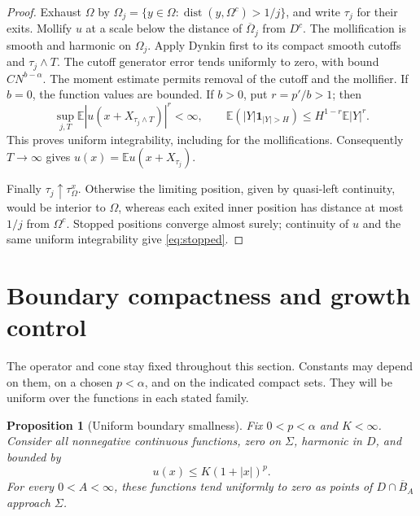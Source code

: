\documentclass[11pt]{article}
\newtheorem{proposition}[theorem]{Proposition}
\numberwithin{equation}{section}
\newcommand{\E}{\mathbb E}
\newcommand{\dist}{\operatorname{dist}}
\begin{document}
\begin{proof}
Exhaust \(\Omega\) by
\(\Omega_j=\{y\in\Omega:\dist(y,\Omega^c)>1/j\}\), and write
\(\tau_j\) for their exits. Mollify \(u\) at a scale below the distance
of \(\overline\Omega_j\) from \(D^c\). The mollification is smooth and
harmonic on \(\Omega_j\). Apply Dynkin first to its compact smooth cutoffs
and \(\tau_j\wedge T\). The cutoff generator error tends uniformly to
zero, with bound \(C N^{b-\alpha}\).
The moment estimate permits removal of the cutoff and the mollifier.
If \(b=0\), the function values are bounded. If \(b>0\), put
\(r=p'/b>1\); then
\[
 \sup_{j,T}\E|u(x+X_{\tau_j\wedge T})|^r<\infty,
 \qquad
 \E(|Y|\mathbf1_{|Y|>H})\le H^{1-r}\E|Y|^r.
\]
This proves uniform integrability, including for the mollifications.
Consequently \(T\to\infty\) gives
\(u(x)=\E u(x+X_{\tau_j})\).

Finally \(\tau_j\uparrow\tau_\Omega^x\). Otherwise the limiting position,
given by quasi-left continuity, would be interior to \(\Omega\), whereas
each exited inner position has distance at most \(1/j\) from \(\Omega^c\).
Stopped positions converge almost surely; continuity of \(u\) and the
same uniform integrability give \eqref{eq:stopped}.
\end{proof}

\section{Boundary compactness and growth control}\label{sec:growth}

The operator and cone stay fixed throughout this section. Constants may
depend on them, on a chosen \(p<\alpha\), and on the indicated compact sets.
They will be uniform over the functions in each stated family.

\begin{proposition}[Uniform boundary smallness]\label{prop:boundary}
Fix \(0<p<\alpha\) and \(K<\infty\). Consider all nonnegative continuous
functions, zero on \(\Sigma\), harmonic in \(D\), and bounded by
\begin{equation}\label{eq:controlled}
 u(x)\le K(1+|x|)^p.
\end{equation}
For every \(0<A<\infty\), these functions tend uniformly to zero as points
of \(D\cap\overline B_A\) approach \(\Sigma\).
\end{proposition}
\end{document}
